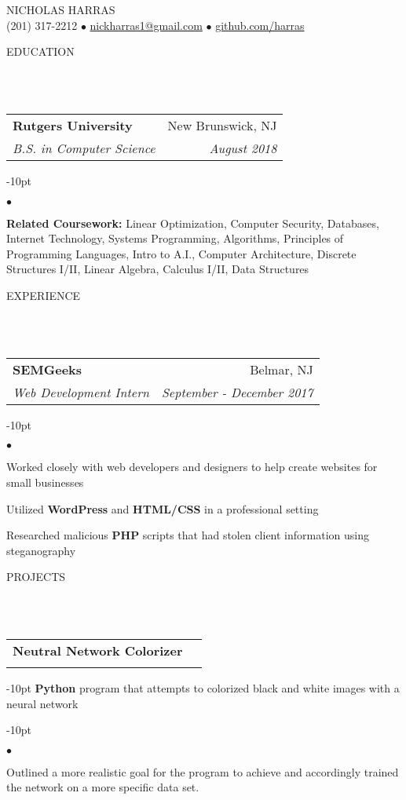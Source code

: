 \documentclass[12pt]{article}
\makeatletter
\newcommand{\lineunder}{
	\vspace*{-8pt} \\ 
	\hspace*{-18pt} 
	\hrulefill \\
}
\newcommand{\header}[1]{
	\vspace*{12pt}
	{\hspace*{-14pt}\vspace*{6pt} #1} %
	\vspace*{-6pt} 
	\lineunder
}
\newcommand{\contact}[2]{
	\vspace*{-8pt}
	\begin{center}
		{#1}\\ %
		#2
	\end{center}
	\vspace*{-12pt}
}
\newenvironment{achievements}{
\begin{adjustwidth}{-10pt}{}
  \begin{list}{$\bullet$}{
  	\topsep 0pt \itemsep -4pt}}
  	{\vspace*{2pt}\end{list}
\end{adjustwidth}
}
\newcommand{\mailto}[1]{
	\href{mailto:#1}{#1}
}
\newcommand{\subheading}[4]{
 	\vspace{5pt}
    	\begin{tabular*}{1.01\textwidth}
    		{l@{\extracolsep{\fill}}r}
      		\hspace{-16pt}\textbf{#1} & #2 \\
      		\hspace{-16pt}\textit{\small#3} & \textit{\small #4} \\
    	\end{tabular*}
    \vspace{-4pt}
}
\makeatother
\begin{document}
\small
\smallskip
\vspace*{-40pt}

\contact{\huge{N}\LARGE{ICHOLAS} \huge{H}\LARGE{ARRAS}}{(201) 317-2212 $\bullet$ \mailto{nickharras1@gmail.com} $\bullet$ \href{https://www.github.com/harras}{github.com/harras}}

\header{EDUCATION}

\subheading
	{Rutgers University}{New Brunswick, NJ}
	{B.S. in Computer Science}{August 2018}
	\begin{achievements}	
	\item{\bf Related Coursework:} Linear Optimization, Computer Security, Databases, Internet Technology, Systems Programming, Algorithms, Principles of Programming Languages, Intro to A.I., Computer Architecture, Discrete Structures I/II, Linear Algebra, Calculus I/II, Data Structures
	\end{achievements}

\header{EXPERIENCE}

\subheading
	{SEMGeeks}{Belmar, NJ}
	{Web Development Intern}{September - December 2017}
	\begin{achievements}
		\item Worked closely with web developers and designers to help create websites for small businesses
		\item Utilized \textbf{WordPress} and \textbf{HTML/CSS} in a professional setting
		\item Researched malicious \textbf{PHP} scripts that had stolen client information using steganography
	\end{achievements}


\header{PROJECTS}

\subheading{Neutral Network Colorizer}{}{}{}
	\vspace{-15pt}
	\begin{adjustwidth}{-10pt}{}
	\textbf{Python} program that attempts to colorized black and white images with a neural network
	\end{adjustwidth}
	\begin{achievements}
		\item Outlined a more realistic goal for the program to achieve and accordingly trained the network on a more specific data set. 
	\end{achievements}
	
\end{document}
